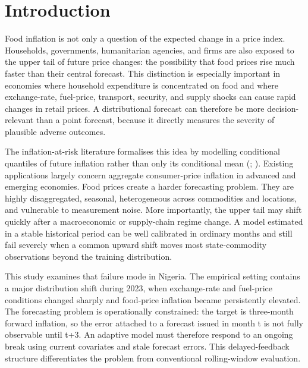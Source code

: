 \section{Introduction}\label{introduction}

Food inflation is not only a question of the expected change in a price
index. Households, governments, humanitarian agencies, and firms are
also exposed to the upper tail of future price changes: the possibility
that food prices rise much faster than their central forecast. This
distinction is especially important in economies where household
expenditure is concentrated on food and where exchange-rate, fuel-price,
transport, security, and supply shocks can cause rapid changes in retail
prices. A distributional forecast can therefore be more
decision-relevant than a point forecast, because it directly measures
the severity of plausible adverse outcomes.

The inflation-at-risk literature formalises this idea by modelling
conditional quantiles of future inflation rather than only its
conditional mean (; ). Existing applications largely concern aggregate consumer-price
inflation in advanced and emerging economies. Food prices create a
harder forecasting problem. They are highly disaggregated, seasonal,
heterogeneous across commodities and locations, and vulnerable to
measurement noise. More importantly, the upper tail may shift quickly
after a macroeconomic or supply-chain regime change. A model estimated
in a stable historical period can be well calibrated in ordinary months
and still fail severely when a common upward shift moves most
state-commodity observations beyond the training distribution.

This study examines that failure mode in Nigeria. The empirical setting
contains a major distribution shift during 2023, when exchange-rate and
fuel-price conditions changed sharply and food-price inflation became
persistently elevated. The forecasting problem is operationally
constrained: the target is three-month forward inflation, so the error
attached to a forecast issued in month t is not fully observable until
t+3. An adaptive model must therefore respond to an ongoing break using
current covariates and stale forecast errors. This delayed-feedback
structure differentiates the problem from conventional rolling-window
evaluation.

